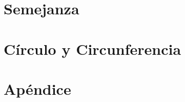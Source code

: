 \documentclass[12pt,titlepage]{article}
\theoremstyle{plain}
\theoremstyle{definition}
\theoremstyle{remark}
\begin{document}
\clearpage

\section{Semejanza}


\clearpage

\section{Círculo y Circunferencia}


\clearpage
\appendix

\section{Apéndice}


% 

% 
\end{document}

